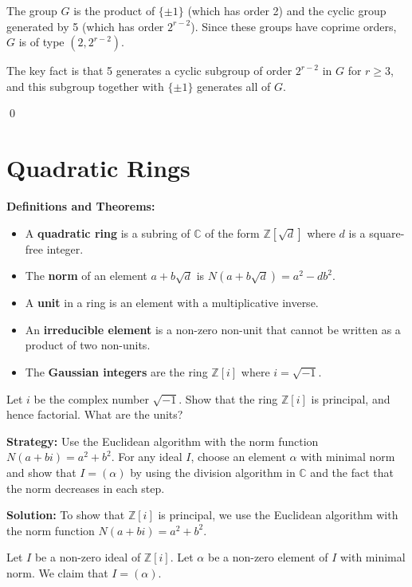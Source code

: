The group $G$ is the product of $\{\pm 1\}$ (which has order 2) and the cyclic group generated by 5 (which has order $2^{r-2}$). Since these groups have coprime orders, $G$ is of type $(2, 2^{r-2})$.

The key fact is that 5 generates a cyclic subgroup of order $2^{r-2}$ in $G$ for $r \geq 3$, and this subgroup together with $\{\pm 1\}$ generates all of $G$.


\qed
\section{Quadratic Rings}

\noindent\textbf{Definitions and Theorems:}
\begin{itemize}
\item A \textbf{quadratic ring} is a subring of $\mathbb{C}$ of the form $\mathbb{Z}[\sqrt{d}]$ where $d$ is a square-free integer.
\item The \textbf{norm} of an element $a + b\sqrt{d}$ is $N(a + b\sqrt{d}) = a^2 - db^2$.
\item A \textbf{unit} in a ring is an element with a multiplicative inverse.
\item An \textbf{irreducible element} is a non-zero non-unit that cannot be written as a product of two non-units.
\item The \textbf{Gaussian integers} are the ring $\mathbb{Z}[i]$ where $i = \sqrt{-1}$.
\end{itemize}

\begin{problembox}
Let $i$ be the complex number $\sqrt{-1}$. Show that the ring $\mathbb{Z}[i]$ is principal, and hence factorial. What are the units?
\end{problembox}

\noindent\textbf{Strategy:} Use the Euclidean algorithm with the norm function $N(a + bi) = a^2 + b^2$. For any ideal $I$, choose an element $\alpha$ with minimal norm and show that $I = (\alpha)$ by using the division algorithm in $\mathbb{C}$ and the fact that the norm decreases in each step.

\noindent\textbf{Solution:}
To show that $\mathbb{Z}[i]$ is principal, we use the Euclidean algorithm with the norm function $N(a + bi) = a^2 + b^2$.

Let $I$ be a non-zero ideal of $\mathbb{Z}[i]$. Let $\alpha$ be a non-zero element of $I$ with minimal norm. We claim that $I = (\alpha)$.

